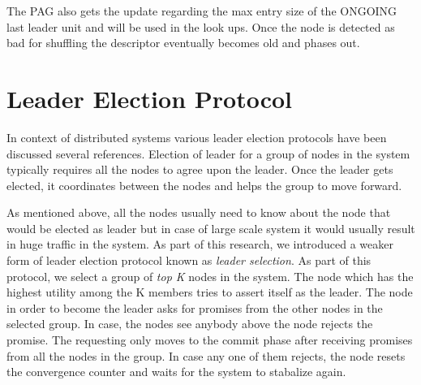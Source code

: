 \documentclass[a4paper, 11pt]{article}
\begin{document}
\begin{enumerate}
The PAG also gets the update regarding the max entry size of the ONGOING last leader unit and will be used in the look ups. Once the node is detected as bad for shuffling the descriptor eventually becomes old and phases out.

\end{enumerate}

\newpage
\section{Leader Election Protocol}

In context of distributed systems various leader election protocols have been discussed {several references}. Election of leader for a group of nodes in the system typically requires all the nodes to agree upon the leader. Once the leader gets elected, it coordinates between the nodes and helps the group to move forward. 
\par As mentioned above, all the nodes usually need to know about the node that would be elected as leader but in case of large scale system it would usually result in huge traffic in the system. As part of this research, we introduced a weaker form of leader election protocol known as \textit{leader selection}. As part of this protocol, we select a group of \textit{top K} nodes in the system. The node which has the highest utility among the K members tries to assert itself as the leader. The node in order to become the leader asks for promises from the other nodes in the selected group. In case, the nodes see anybody above the node rejects the promise. The requesting only moves to the commit phase after receiving promises from all the nodes in the group. In case any one of them rejects, the node resets the convergence counter and waits for the system to stabalize again. 
\end{document}
